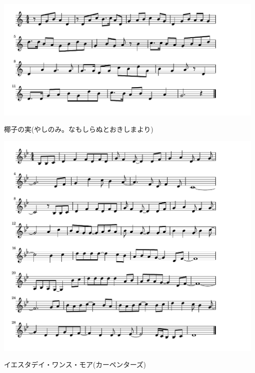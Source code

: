 \documentclass[a4paper]{ltjsarticle}
\begin{document}
\includegraphics[clip]{yashinomi_crop.pdf}

\vspace{-10mm} \hspace{10mm}
椰子の実(やしのみ。なもしらぬとおきしまより)

\includegraphics[clip]{yesterdayonce_crop.pdf}

\vspace{-10mm} \hspace{10mm}
イエスタデイ・ワンス・モア(カーペンターズ)
\end{document}
